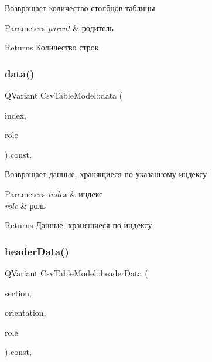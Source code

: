 Возвращает количество столбцов таблицы 


\begin{DoxyParams}{Parameters}
{\em parent} & родитель \\
\hline
\end{DoxyParams}
\begin{DoxyReturn}{Returns}
Количество строк 
\end{DoxyReturn}
\mbox{\label{class_csv_table_model_a86cfc5e15808768e3517f5183e7d5fbb}} 
\subsubsection{\texorpdfstring{data()}{data()}}
{\footnotesize\ttfamily Q\+Variant Csv\+Table\+Model\+::data (\begin{DoxyParamCaption}\item[{const Q\+Model\+Index \&}]{index,  }\item[{int}]{role }\end{DoxyParamCaption}) const\hspace{0.3cm}{\ttfamily [override]}, {\ttfamily [virtual]}}



Возвращает данные, хранящиеся по указанному индексу 


\begin{DoxyParams}{Parameters}
{\em index} & индекс \\
\hline
{\em role} & роль \\
\hline
\end{DoxyParams}
\begin{DoxyReturn}{Returns}
Данные, хранящиеся по индексу 
\end{DoxyReturn}
\mbox{\label{class_csv_table_model_ae5790a6d1cbfcfdf7b8b5a4ce4a63748}} 
\subsubsection{\texorpdfstring{header\+Data()}{headerData()}}
{\footnotesize\ttfamily Q\+Variant Csv\+Table\+Model\+::header\+Data (\begin{DoxyParamCaption}\item[{int}]{section,  }\item[{Qt\+::\+Orientation}]{orientation,  }\item[{int}]{role }\end{DoxyParamCaption}) const\hspace{0.3cm}{\ttfamily [override]}, {\ttfamily [virtual]}}



